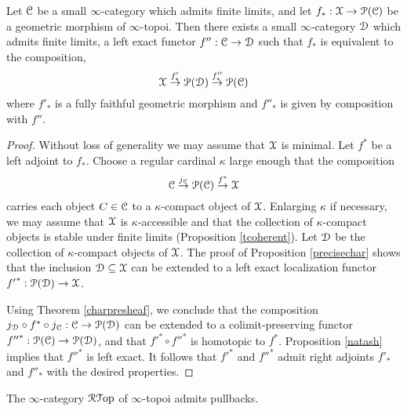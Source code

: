 \begin{lemma}\label{squarepeg}
Let $\operatorname{\mathcal{C}}$ be a small $\infty$-category which admits finite limits, and let
$f_{\ast}: \operatorname{\mathcal{X}} \rightarrow \operatorname{\mathcal{P}}(\operatorname{\mathcal{C}})$ be a geometric morphism of $\infty$-topoi.
Then there exists a small $\infty$-category $\operatorname{\mathcal{D}}$ which admits finite limits, a left
exact functor $f'': \operatorname{\mathcal{C}} \rightarrow \operatorname{\mathcal{D}}$ such that $f_{\ast}$ is equivalent to the composition,
$$ \operatorname{\mathcal{X}} \stackrel{f'_{\ast}}{\rightarrow} \operatorname{\mathcal{P}}( \operatorname{\mathcal{D}}) \stackrel{ f''_{\ast}}{\rightarrow} \operatorname{\mathcal{P}}(\operatorname{\mathcal{C}})$$
where $f'_{\ast}$ is a fully faithful geometric morphism and $f''_{\ast}$ is given by composition with $f''$.
\end{lemma}

\begin{proof}
Without loss of generality we may assume that $\operatorname{\mathcal{X}}$ is minimal. Let $f^{\ast}$ be a left adjoint to $f_{\ast}$. Choose a regular cardinal $\kappa$ large enough that the composition
$$ \operatorname{\mathcal{C}} \stackrel{j_{\operatorname{\mathcal{C}}}}{\rightarrow} \operatorname{\mathcal{P}}(\operatorname{\mathcal{C}}) \stackrel{f^{\ast}}{\rightarrow} \operatorname{\mathcal{X}}$$
carries each object $C \in \operatorname{\mathcal{C}}$ to a $\kappa$-compact object of $\operatorname{\mathcal{X}}$. Enlarging
$\kappa$ if necessary, we may assume that $\operatorname{\mathcal{X}}$ is $\kappa$-accessible and that the collection
of $\kappa$-compact objects is stable under finite limits (Proposition \ref{tcoherent}). Let $\operatorname{\mathcal{D}}$ be the collection of $\kappa$-compact objects of $\operatorname{\mathcal{X}}$. The proof of Proposition \ref{precisechar} shows that the inclusion $\operatorname{\mathcal{D}} \subseteq \operatorname{\mathcal{X}}$ can be extended to a left exact localization functor ${f'}^{\ast}: \operatorname{\mathcal{P}}(\operatorname{\mathcal{D}}) \rightarrow \operatorname{\mathcal{X}}$. 

Using Theorem \ref{charpresheaf}, we conclude that the composition
$j_{\operatorname{\mathcal{D}}} \circ f^{\ast} \circ j_{\operatorname{\mathcal{C}}}: \operatorname{\mathcal{C}} \rightarrow \operatorname{\mathcal{P}}(\operatorname{\mathcal{D}})$ can be extended
to a colimit-preserving functor ${f''}^{\ast}: \operatorname{\mathcal{P}}(\operatorname{\mathcal{C}}) \rightarrow \operatorname{\mathcal{P}}(\operatorname{\mathcal{D}})$, and that
${f'}^{\ast} \circ {f''}^{\ast}$ is homotopic to $f^{\ast}$. Proposition \ref{natash} implies that ${f''}^{\ast}$ is left exact. It follows that ${f'}^{\ast}$ and ${f''}^{\ast}$ admit right adjoints $f'_{\ast}$ and
$f''_{\ast}$ with the desired properties.
\end{proof}

\begin{proposition}\label{swunder}
The $\infty$-category $\operatorname{\mathcal{R}{\mathcal T}op}$ of $\infty$-topoi admits pullbacks.
\end{proposition}

